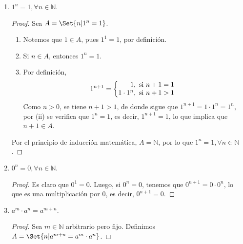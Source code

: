 \documentclass[11pt]{article}
\newcommand{\N}{\mathbb{N}}
\let\set\Set
\begin{document}
\begin{enumerate}[label=\alph*)]
    \item $1^n=1, \forall n\in \N$.
    \vspace{-1em}
    \begin{proof} Sea $A=\set{n|1^n=1}$.
    \begin{enumerate}[label=\roman*)]
    \item Notemos que $1\in A$, pues $1^1=1$, por definición.
    \item Si $n\in A$, entonces $1^n=1$.
    \item Por definición, \begin{align*}
        1^{n+1} = \left\{
            \begin{array}{@{}r@{\thinspace}l}
                1, &  \ \text{si}  \ n+1 = 1\\
                1\cdot 1^{n}, &  \ \text{si}  \ n+1 > 1
            \end{array} \right.
        \end{align*}
    Como $n>0$, se tiene $n+1>1$, de donde sigue que $1^{n+1}=1\cdot 1^n=1^n$, por (ii) se verifica que $1^n=1$, es decir, $1^{n+1}=1$, lo que implica que $n+1\in A$.
    \end{enumerate}

    Por el principio de inducción matemática, $A=\N$, por lo que $1^n=1, \forall n\in \N$.
    \end{proof} \vspace{-1em}

    \item $0^n=0, \forall n\in \N$.
    \vspace{-1em}
    \begin{proof}
    Es claro que $0^1=0$. Luego, si $0^n=0$, tenemos que $0^{n+1}=0 \cdot 0^n$, lo que es una multiplicación por $0$, es decir, $0^{n+1}=0$.
    \end{proof} \vspace{-1em}
    

    \item $a^m \cdot a^n = a^{m+n}$.
    
    \vspace{-1em}
    \begin{proof} Sea $m\in \N$ arbitrario pero fijo. Definimos $A=\set{n|a^{m+n}=a^m\cdot a^n}$.


\end{proof}
\end{enumerate}
\end{document}
